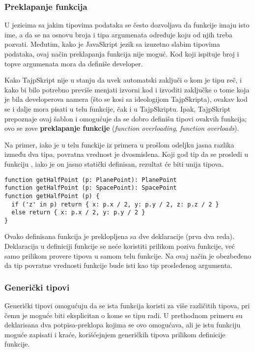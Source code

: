 \subsubsection{Preklapanje funkcija}

U jezicima sa jakim tipovima podataka se često dozvoljava da funkcije imaju isto ime, a da se na osnovu broja i tipa argumenata određuje koju od njih treba pozvati.
Međutim, kako je JavaSkript jezik sa izuzetno slabim tipovima podataka, ovaj način preklapanja funkcija nije moguć.
Kod koji ispituje broj i topve argumenata mora da definiše developer.

Kako TajpSkript nije u stanju da uvek automatski zaključi o kom je tipu reč, i kako bi bilo potrebno previše menjati izvorni kod i izvoditi zaključke o tome koja je bila developerova namera (što se kosi sa ideologijom TajpSkripta), ovakav kod se i dalje mora pisati u telu funkcije, čak i u TajpSkriptu.
Ipak, TajpSkript prepoznaje ovaj šablon i omogućuje da se dobro definišu tipovi ovakvih funkcija; ovo se zove \textbf{preklapanje funkcije} (\textsl{function overloading}, \textsl{function overloads}).

Na primer, iako je u telu funckije iz primera u prošlom odeljku jasna razlika između dva tipa, povratna vrednost je dvosmislena.
Koji god tip da se prosledi u funkciju , iako je on jasno statički definisan, rezultat će biti unija tipova.

\begin{verbatim}
function getHalfPoint (p: PlanePoint): PlanePoint
function getHalfPoint (p: SpacePoint): SpacePoint
function getHalfPoint (p) {
  if ('z' in p) return { x: p.x / 2, y: p.y / 2, z: p.z / 2 }
  else return { x: p.x / 2, y: p.y / 2 }
}
\end{verbatim}

Ovako definisana funkcija je preklopljena sa dve deklaracije (prva dva reda).
Deklaracija u definiciji funkcije se neće koristiti prilikom poziva funkcije, već samo prilikom provere tipova u samom telu funkcije.
Na ovaj način je obezbeđeno da tip povratne vrednosti funkcije bude isti kao tip prosleđenog argumenta.

\subsubsection{Generički tipovi}

Generički tipovi omogućuju da se ista funkcija koristi za više različitih tipova, pri čemu je moguće biti eksplicitan o kome se tipu radi.
U prethodnom primeru su deklarisana dva potpisa-preklopa kojima se ovo omogućava, ali je istu funkciju moguće zapisati i kraće, korišćejnjem generičkih tipova prilikom definicije funkcije.

